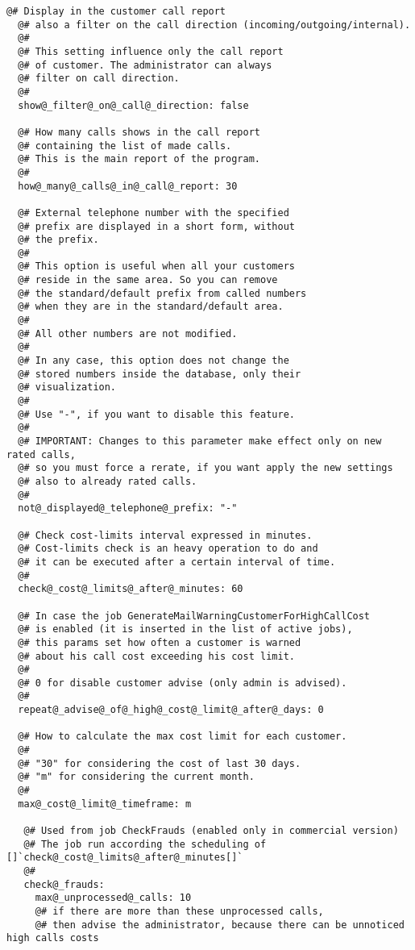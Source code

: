 \documentclass[letterpaper,10pt,english]{sphinxmanual}
\begin{document}
\begin{Verbatim}[commandchars=@\[\]]
  @# Display in the customer call report
  @# also a filter on the call direction (incoming/outgoing/internal).
  @#
  @# This setting influence only the call report
  @# of customer. The administrator can always
  @# filter on call direction.
  @#
  show@_filter@_on@_call@_direction: false

  @# How many calls shows in the call report
  @# containing the list of made calls.
  @# This is the main report of the program.
  @# 
  how@_many@_calls@_in@_call@_report: 30

  @# External telephone number with the specified
  @# prefix are displayed in a short form, without
  @# the prefix.
  @# 
  @# This option is useful when all your customers
  @# reside in the same area. So you can remove 
  @# the standard/default prefix from called numbers
  @# when they are in the standard/default area.
  @#
  @# All other numbers are not modified.
  @# 
  @# In any case, this option does not change the
  @# stored numbers inside the database, only their
  @# visualization.
  @#
  @# Use "-", if you want to disable this feature.
  @#
  @# IMPORTANT: Changes to this parameter make effect only on new rated calls,
  @# so you must force a rerate, if you want apply the new settings
  @# also to already rated calls.
  @#
  not@_displayed@_telephone@_prefix: "-"

  @# Check cost-limits interval expressed in minutes.
  @# Cost-limits check is an heavy operation to do and 
  @# it can be executed after a certain interval of time.
  @# 
  check@_cost@_limits@_after@_minutes: 60

  @# In case the job GenerateMailWarningCustomerForHighCallCost 
  @# is enabled (it is inserted in the list of active jobs), 
  @# this params set how often a customer is warned
  @# about his call cost exceeding his cost limit.
  @#
  @# 0 for disable customer advise (only admin is advised).
  @#
  repeat@_advise@_of@_high@_cost@_limit@_after@_days: 0

  @# How to calculate the max cost limit for each customer.
  @#
  @# "30" for considering the cost of last 30 days.
  @# "m" for considering the current month.
  @# 
  max@_cost@_limit@_timeframe: m

   @# Used from job CheckFrauds (enabled only in commercial version)
   @# The job run according the scheduling of []`check@_cost@_limits@_after@_minutes[]`
   @#
   check@_frauds:
     max@_unprocessed@_calls: 10
     @# if there are more than these unprocessed calls,
     @# then advise the administrator, because there can be unnoticed high calls costs


\end{Verbatim}
\end{document}

